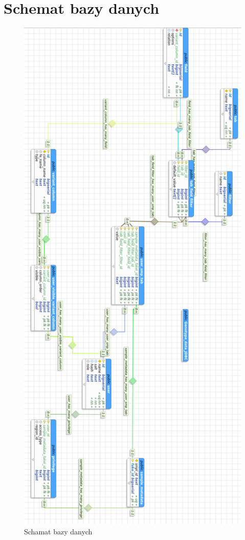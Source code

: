 \documentclass[a4paper,12pt,twoside]{article}
\begin{document}
\section{Schemat bazy danych}
\begin{figure}[h!]
\includegraphics[width=\textwidth, height=0.9\textheight]{obrazy/aplikacja/database.png}
\caption{Schamat bazy danych}
\label{fig:bazadanych}
\end{figure}
\end{document}
